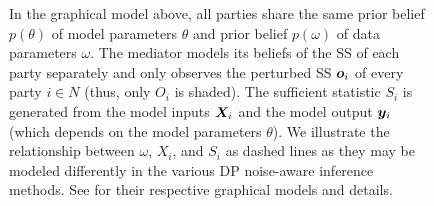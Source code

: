 \documentclass{article}
\theoremstyle{plain}
\theoremstyle{definition}
\theoremstyle{remark}
\begin{document}
\begin{figure}[ht]
 \begin{center}
 \end{center}
  \caption{In the graphical model above, all parties share the same prior belief $p(\theta)$ of model parameters $\theta$ and prior belief $p(\omega)$ of data parameters $\omega$. The mediator models its beliefs of the SS of each party separately and only observes the perturbed SS ${\bm{o}}_i$ of every party $i \in N$ (thus, only $O_i$ is shaded).
  The sufficient statistic $S_i$ is generated from the model inputs ${\bm{X}}_i$ and the model output ${\bm{y}}_i$ (which depends on the model parameters $\theta$).
  We illustrate the relationship between $\omega$, $X_i$, and $S_i$ as dashed lines as they may be modeled differently in the various DP noise-aware inference methods. See \cite{bernstein2019blr,kulkarni2021glm} for their respective graphical models and details.
  }
  \label{fig:tikz-noise-aware-2}
\end{figure}
\end{document}
